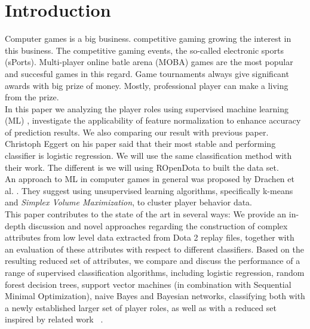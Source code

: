 \section{Introduction}

Computer games is a big business. competitive gaming growing the interest in this business. The competitive gaming events, the so-called electronic sports (sPorts). Multi-player online batle arena (MOBA) games are the most popular and succesful games in this regard. Game tournaments always give significant awards with big prize of money. Mostly, professional player can make a living from the prize. 
\\
In this paper we analyzing the player roles using supervised machine learning (ML) , investigate the applicability of feature normalization to enhance accuracy of prediction results. We also comparing our result with previous paper. Christoph Eggert on his paper said that their most stable and performing classifier is logistic regression. We will use the same classification method with their work. The different is we will using ROpenDota to built the data set.
\\
An approach to ML in computer games in general was proposed by Drachen et al.\cite{drachen2014skill} . They suggest using unsupervised learning algorithms, specifically k-means and \textit{Simplex Volume Maximization}, to cluster player behavior data.
\\
This paper contributes to the state of the art in several ways: We provide an in-depth discussion and novel approaches regarding the construction of complex attributes from low level data extracted from Dota 2 replay files, together with an evaluation of these attributes with respect to different classifiers. Based on the resulting reduced set of attributes, we compare and discuss the performance of a range of supervised classification algorithms, including logistic regression, random forest decision trees, support vector machines (in combination with Sequential Minimal Optimization), naive Bayes and Bayesian networks, classifying both with a newly established larger set of player roles, as well as with a reduced set inspired by related work ~\cite{eggert2015classification}.